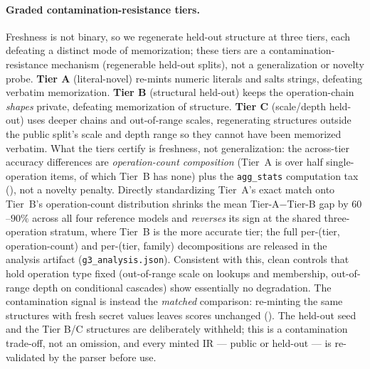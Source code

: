 \paragraph{Graded contamination-resistance tiers.} Freshness is not binary, so we
regenerate held-out structure at three tiers, each defeating a distinct mode of
memorization; these tiers are a contamination-resistance mechanism (regenerable
held-out splits), not a generalization or novelty probe. \textbf{Tier A} (literal-novel)
re-mints numeric literals and salts strings, defeating verbatim memorization. \textbf{Tier
B} (structural held-out) keeps the operation-chain \emph{shapes} private, defeating
memorization of structure. \textbf{Tier C} (scale/depth held-out) uses deeper chains and
out-of-range scales, regenerating structures outside the public split's scale and depth
range so they cannot have been memorized verbatim. What the tiers certify is freshness,
not generalization: the across-tier accuracy differences are \emph{operation-count
composition} (Tier~A is over half single-operation items, of which Tier~B has none) plus
the \texttt{agg\_stats} computation tax (), not a novelty penalty.
Directly standardizing Tier~A's exact match onto Tier~B's operation-count distribution
shrinks the mean Tier-A$-$Tier-B gap by $60$--$90\%$ across all four reference models and
\emph{reverses} its sign at the shared three-operation stratum, where Tier~B is the more
accurate tier; the full per-(tier, operation-count) and per-(tier, family) decompositions
are released in the analysis artifact (\texttt{g3\_analysis.json}). Consistent with this, clean
controls that hold operation type fixed (out-of-range scale on lookups and membership,
out-of-range depth on conditional cascades) show essentially no degradation. The
contamination signal is instead the \emph{matched} comparison: re-minting the same
structures with fresh secret values leaves scores unchanged (). The held-out seed and the Tier B/C
structures are deliberately withheld; this is a contamination trade-off, not an omission,
and every minted IR --- public or held-out --- is re-validated by the parser before use.
